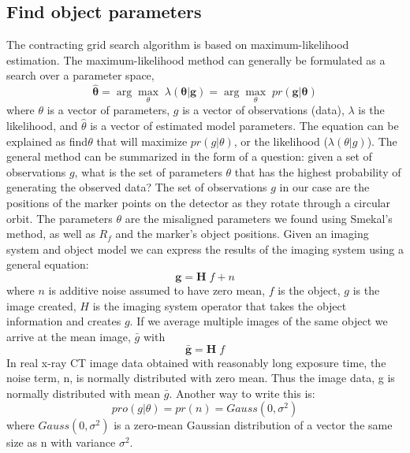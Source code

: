 \subsection{Find object parameters}
The contracting grid search algorithm is based on maximum-likelihood estimation.  The maximum-likelihood method can generally be formulated as a search over a parameter space, 
\begin{equation}
\label{eq:mlem}
\mathbf{\hat{\theta}} = \arg\max_{\theta} \; \lambda (\mathbf{\theta | g}) = \arg\max_{\theta} \; pr( \mathbf{g| \theta} )
\end{equation}
where $\theta$ is a vector of parameters, $g$ is a vector of observations (data), $\lambda$ is the likelihood, and $\hat{\theta}$ is a vector of estimated model parameters. 
The equation can be explained as find$\theta$ that will maximize $pr(g|\theta)$, or the likelihood ($\lambda(\theta|g)$). The general method can be summarized in the form of a question: given a set of observations $g$, what is the set of parameters $\theta$ that has the highest probability of generating the observed data?  
The set of observations $g$ in our case are the positions of the marker points on the detector as they rotate through a circular orbit. The parameters $\theta$ are the misaligned parameters we found using Smekal's method, as well as $R_f$ and the marker's object positions.  Given an imaging system and object model we can express the results of the imaging system using a general equation:
\begin{equation}
\label{eq:gHf}
\mathbf{g} = \mathbf{H} \; f + n
\end{equation}
where $n$ is additive noise assumed to have zero mean, $f$ is the object, $g$ is the image created, $H$ is the imaging system operator that takes the object information and creates $g$.  If we average multiple images of the same object we arrive at the mean image, $\bar{g}$ with
\begin{equation}
\label{eq:gbar}
\bar{\mathbf{g}} = \mathbf{H} \; f
\end{equation}
In real x-ray CT image data obtained with reasonably long exposure time, the noise term, n, is normally distributed with zero mean.  Thus the image data, g is normally distributed with mean $\bar{g}$.  Another way to write this is:
\begin{equation}
\label{eq:prob_gaus}
pro(g|\theta) = pr(n) = Gauss(0, \sigma^2)
\end{equation}
where $Gauss(0, \sigma^2)$ is a zero-mean Gaussian distribution of a vector the same size as n with variance $\sigma^2$.
